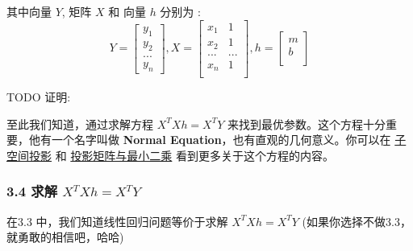\documentclass[11pt]{article}
\begin{document}
其中向量 \(Y\), 矩阵 \(X\) 和 向量 \(h\) 分别为 : \[
Y =  \begin{bmatrix}
    y_1 \\
    y_2 \\
    ... \\
    y_n
\end{bmatrix}
,
X =  \begin{bmatrix}
    x_1 & 1 \\
    x_2 & 1\\
    ... & ...\\
    x_n & 1 \\
\end{bmatrix},
h =  \begin{bmatrix}
    m \\
    b \\
\end{bmatrix}
\]

    TODO 证明:

    至此我们知道，通过求解方程 \(X^TXh = X^TY\)
来找到最优参数。这个方程十分重要，他有一个名字叫做 \textbf{Normal
Equation}，也有直观的几何意义。你可以在
\href{http://open.163.com/movie/2010/11/J/U/M6V0BQC4M_M6V2AJLJU.html}{子空间投影}
和
\href{http://open.163.com/movie/2010/11/P/U/M6V0BQC4M_M6V2AOJPU.html}{投影矩阵与最小二乘}
看到更多关于这个方程的内容。

    \subsubsection{\texorpdfstring{3.4 求解
\(X^TXh = X^TY\)}{3.4 求解 X\^{}TXh = X\^{}TY}}\label{ux6c42ux89e3-xtxh-xty}

在3.3 中，我们知道线性回归问题等价于求解 \(X^TXh = X^TY\)
(如果你选择不做3.3，就勇敢的相信吧，哈哈)
\end{document}
